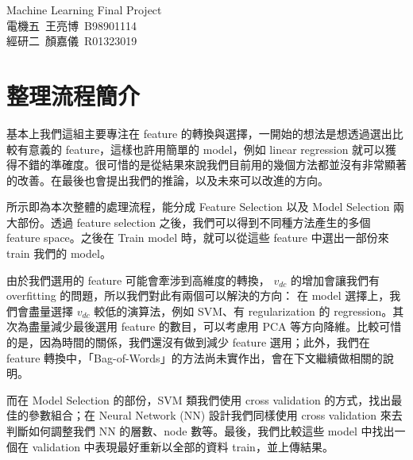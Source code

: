 

\newcommand{\link}[2]{ \href{#1}{\textcolor{Gray}{#2}}}
\newcommand{\statatab}[1]{
\begin{table}[H]\centering\begin{threeparttable}
\end{threeparttable}\end{table}}

\usepackage{enumitem}

\pagestyle{main}

\setlength{\baselineskip}{1.5em}
\setlength{\parskip}{0.5em}

\thispagestyle{empty}
\begin{center}
{\optima\LARGE Machine Learning Final Project}\\[0.5em]
電機五~王亮博~B98901114 \\
經研二~顏嘉儀~R01323019
\end{center}

\section{整理流程簡介}
基本上我們這組主要專注在 feature 的轉換與選擇，一開始的想法是想透過選出比較有意義的 feature，這樣也許用簡單的 model，例如 linear regression 就可以獲得不錯的準確度。很可惜的是從結果來說我們目前用的幾個方法都並沒有非常顯著的改善。在最後也會提出我們的推論，以及未來可以改進的方向。

 所示即為本次整體的處理流程，能分成 Feature Selection 以及 Model Selection 兩大部份。透過 feature selection 之後，我們可以得到不同種方法產生的多個 feature space。之後在 Train model 時，就可以從這些 feature 中選出一部份來 train 我們的 model。

由於我們選用的 feature 可能會牽涉到高維度的轉換， $v_{dc}$ 的增加會讓我們有 overfitting 的問題，所以我們對此有兩個可以解決的方向：
在 model 選擇上，我們會盡量選擇 $v_{dc}$ 較低的演算法，例如 SVM、有 regularization 的 regression。其次為盡量減少最後選用 feature 的數目，可以考慮用 PCA 等方向降維。比較可惜的是，因為時間的關係，我們還沒有做到減少 feature 選用；此外，我們在 feature 轉換中，「Bag-of-Words」的方法尚未實作出，會在下文繼續做相關的說明。

而在 Model Selection 的部份，SVM 類我們使用 cross validation 的方式，找出最佳的參數組合；在 Neural Network (NN) 設計我們同樣使用 cross validation 來去判斷如何調整我們 NN 的層數、node 數等。最後，我們比較這些 model 中找出一個在 validation 中表現最好重新以全部的資料 train，並上傳結果。

